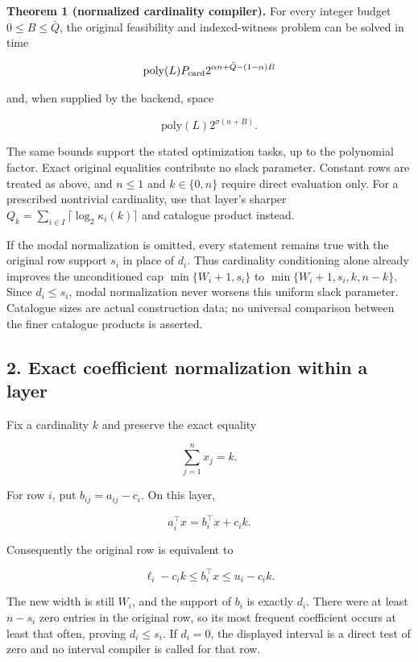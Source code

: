 \textbf{Theorem 1 (normalized cardinality compiler).} For every integer budget \(0\le B\le\bar Q\), the original feasibility and indexed-witness problem can be solved in time

\[
\mathrm{poly}(L)P_{\rm card}
2^{\alpha n+\bar Q-(1-\alpha)B}
\]

and, when supplied by the backend, space

\[
\mathrm{poly}(L)2^{\sigma(n+B)}.
\]

The same bounds support the stated optimization tasks, up to the polynomial factor. Exact original equalities contribute no slack parameter. Constant rows are treated as above, and \(n\le1\) and \(k\in\{0,n\}\) require direct evaluation only. For a prescribed nontrivial cardinality, use that layer's sharper \(Q_k=\sum_{i\in I}\lceil\log_2\kappa_i(k)\rceil\) and catalogue product instead.

If the modal normalization is omitted, every statement remains true with the original row support \(s_i\) in place of \(d_i\). Thus cardinality conditioning alone already improves the unconditioned cap \(\min\{W_i+1,s_i\}\) to \(\min\{W_i+1,s_i,k,n-k\}\). Since \(d_i\le s_i\), modal normalization never worsens this uniform slack parameter. Catalogue sizes are actual construction data; no universal comparison between the finer catalogue products is asserted.

\hypertarget{af-2bf1c1784c-exact-coefficient-normalization-within-a-layer}{%
\subsection{2. Exact coefficient normalization within a layer}\label{af-2bf1c1784c-exact-coefficient-normalization-within-a-layer}}

Fix a cardinality \(k\) and preserve the exact equality

\[
\sum_{j=1}^n x_j=k.
\]

For row \(i\), put \(b_{ij}=a_{ij}-c_i\). On this layer,

\[
a_i^\top x=b_i^\top x+c_i k.
\]

Consequently the original row is equivalent to

\[
\ell_i-c_i k\le b_i^\top x\le u_i-c_i k.
\]

The new width is still \(W_i\), and the support of \(b_i\) is exactly \(d_i\). There were at least \(n-s_i\) zero entries in the original row, so its most frequent coefficient occurs at least that often, proving \(d_i\le s_i\). If \(d_i=0\), the displayed interval is a direct test of zero and no interval compiler is called for that row.

